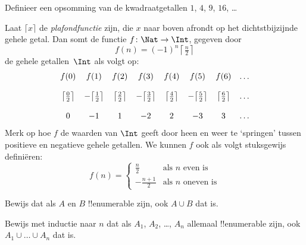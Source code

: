 \documentclass[openany]{memoir}
\begin{document}
\begin{prob}
Definieer een opsomming van de kwadraatgetallen $1$, $4$, $9$, $16$,
\dots
\end{prob}

\begin{ex}
Laat $\lceil x \rceil$ de \emph{plafondfunctie} zijn, die $x$ naar
boven afrondt op het dichtstbijzijnde gehele getal. Dan somt de functie
$f \colon \Nat \to \Int$, gegeven door
\[
  f(n) = (-1)^{n} \left\lceil\tfrac{n}{2}\right\rceil
\]
de gehele getallen~$\Int$ als volgt op:
\[
\begin{array}{c c c c c c c c}
f(0) & f(1) & f(2) & f(3) & f(4) & f(5) & f(6) & \dots \\ \\
\big\lceil \tfrac{0}{2} \big\rceil & -\big\lceil \tfrac{1}{2}\big\rceil &  \big\lceil \tfrac{2}{2} \big\rceil & -\big\lceil \tfrac{3}{2} \big\rceil & \big\lceil \tfrac{4}{2} \big\rceil  & -\big\lceil \tfrac{5}{2}\big\rceil & \big\lceil \tfrac{6}{2} \big\rceil & \dots \\ \\
0 & -1 & 1 & -2 & 2 & -3 & 3& \dots
\end{array}
\]
Merk op hoe $f$ de waarden van $\Int$ geeft door heen en weer te
‘springen’ tussen positieve en negatieve gehele getallen. We kunnen
$f$ ook als volgt stuksgewijs definiëren:
\[
f(n) = \begin{cases}
  \frac{n}{2} & \text{als $n$ even is}\\
  -\frac{n+1}{2} & \text{als $n$ oneven is}
  \end{cases}
\]
\end{ex}

\begin{prob}
Bewijs dat als $A$ en $B$ !!{enumerable} zijn, ook $A \cup B$ dat is.
\end{prob}

\begin{prob}
Bewijs met inductie naar $n$ dat als $A_1$, $A_2$, \dots, $A_n$
allemaal !!{enumerable} zijn, ook $A_1 \cup \dots \cup A_n$ dat is.
\end{prob}
\endgroup

\begingroup
\def\olfilename{OLP-0039}
\def\olfilepath{content/sets-functions-relations/size-of-sets/}
\hypertarget{unit-OLP-0039}{}
\end{document}
